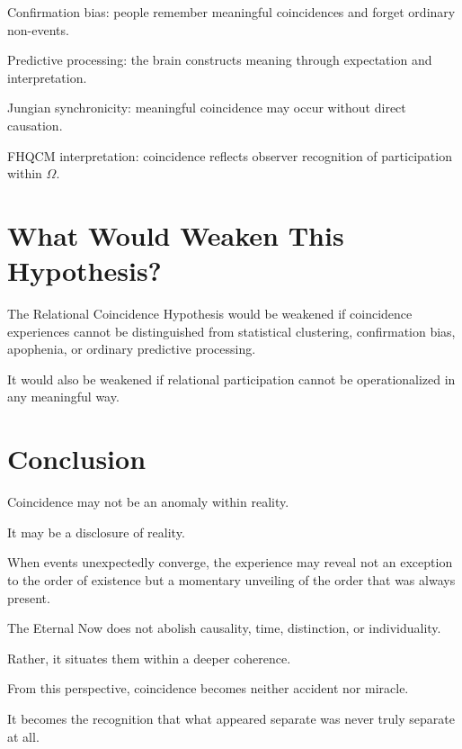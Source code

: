Confirmation bias: people remember meaningful coincidences and forget ordinary non-events.

Predictive processing: the brain constructs meaning through expectation and interpretation.

Jungian synchronicity: meaningful coincidence may occur without direct causation.

FHQCM interpretation: coincidence reflects observer recognition of participation within $\Omega$.

\section{What Would Weaken This Hypothesis?}

The Relational Coincidence Hypothesis would be weakened if coincidence experiences cannot be distinguished from statistical clustering, confirmation bias, apophenia, or ordinary predictive processing.

It would also be weakened if relational participation cannot be operationalized in any meaningful way.

\section{Conclusion}

Coincidence may not be an anomaly within reality.

It may be a disclosure of reality.

When events unexpectedly converge, the experience may reveal not an exception to the order of existence but a momentary unveiling of the order that was always present.

The Eternal Now does not abolish causality, time, distinction, or individuality.

Rather, it situates them within a deeper coherence.

From this perspective, coincidence becomes neither accident nor miracle.

It becomes the recognition that what appeared separate was never truly separate at all.

